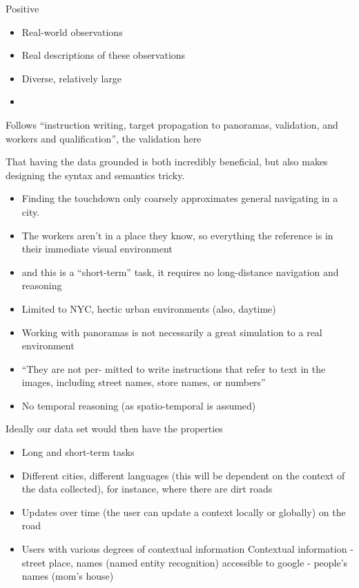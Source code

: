 \documentclass[a4paper, 11pt]{article}
\begin{document}
Positive

\begin{itemize}
\item Real-world observations
\item Real descriptions of these observations
\item Diverse, relatively large
\item
\end{itemize}

Follows ``instruction writing, target propagation to panoramas, validation, and
workers and qualification'', the validation here 

That having the data grounded is both incredibly beneficial, but also makes
designing the syntax and semantics tricky.

\begin{itemize}
\item Finding the touchdown only coarsely approximates general navigating in a city.
\item The workers
  aren't in a place they know, so everything the reference is in their immediate
  visual environment
\item and this is a ``short-term'' task, it requires no long-distance navigation
  and reasoning 
\item Limited to NYC, hectic urban environments (also, daytime)
\item Working with panoramas is not necessarily a great simulation to a real environment
\item ``They are not per- mitted to write instructions that refer to text in the
images, including street names, store names, or numbers''
\item No temporal reasoning (as spatio-temporal is assumed)
\end{itemize}

Ideally our data set would then have the properties

\begin{itemize}
\item Long and short-term tasks
\item Different cities, different languages (this will be dependent on the
  context of the data collected), for instance, where there are dirt roads
\item Updates over time (the user can update a context locally or globally) on
  the road
\item Users with various degrees of contextual information
  Contextual information
  - street place, names (named entity recognition) accessible to google
  - people's names (mom's house)
\end{itemize}
\end{document}
